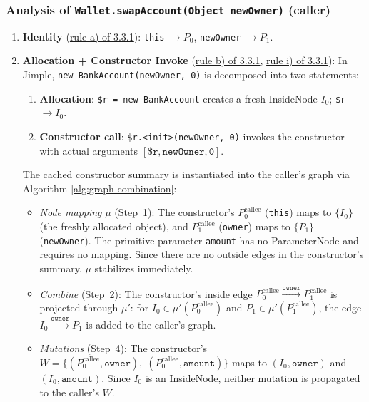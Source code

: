 \subsubsection{Analysis of \texttt{Wallet.swapAccount(Object newOwner)} (caller)}

\begin{enumerate}
\item \textbf{Identity} (\hyperref[agl4a]{rule a) of 3.3.1}): \texttt{this} $\to P_0$, \texttt{newOwner} $\to P_1$.

\item \textbf{Allocation + Constructor Invoke} (\hyperref[agl4b]{rule b) of 3.3.1}, \hyperref[agl4i]{rule i) of 3.3.1}): 
  In Jimple, \texttt{new BankAccount(newOwner, 0)} is decomposed into two statements:
  \begin{enumerate}
    \item[(a)] \textbf{Allocation}: \texttt{\$r = new BankAccount} creates a fresh InsideNode $I_0$; \texttt{\$r} $\to I_0$.
    \item[(b)] \textbf{Constructor call}: \texttt{\$r.\textless init\textgreater(newOwner, 0)} invokes the constructor with actual arguments $[\texttt{\$r}, \texttt{newOwner}, \texttt{0}]$.
  \end{enumerate}

  The cached constructor summary is instantiated into the caller's graph via Algorithm \ref{alg:graph-combination}:

  \begin{itemize}
  \item \textit{Node mapping} $\mu$ (Step~1): The constructor's $P_0^{\text{callee}}$ (\texttt{this}) maps to $\{I_0\}$ (the freshly allocated object), and $P_1^{\text{callee}}$ (\texttt{owner}) maps to $\{P_1\}$ (\texttt{newOwner}).
  The primitive parameter \texttt{amount} has no ParameterNode and requires no mapping.
  Since there are no outside edges in the constructor's summary, $\mu$ stabilizes immediately.

  \item \textit{Combine} (Step~2): The constructor's inside edge $P_0^{\text{callee}} \xrightarrow{\texttt{owner}} P_1^{\text{callee}}$ is projected through $\mu'$: for $I_0 \in \mu'(P_0^{\text{callee}})$ and $P_1 \in \mu'(P_1^{\text{callee}})$, the edge $I_0 \xrightarrow{\texttt{owner}} P_1$ is added to the caller's graph.

  \item \textit{Mutations} (Step~4): The constructor's $W = \{(P_0^{\text{callee}}, \texttt{owner}),\; (P_0^{\text{callee}}, \texttt{amount})\}$ maps to $(I_0, \texttt{owner})$ and $(I_0, \texttt{amount})$. Since $I_0$ is an InsideNode, neither mutation is propagated to the caller's $W$.
  \end{itemize}


\end{enumerate}
